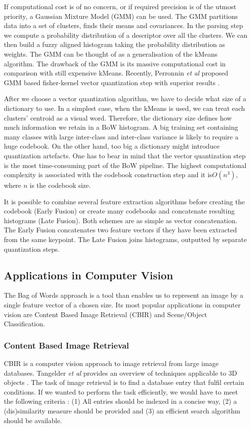 		If computational cost is of no concern, or if required precision is of the utmost priority, a Gaussian Mixture Model (GMM) can be used. The GMM partitions data into a set of clusters, finds their means and covariances. In the parsing step we compute a probability distribution of a descriptor over all the clusters. We can then build a fuzzy aligned histogram taking the probability distribution as weights. The GMM can be thought of as a generalisation of the kMeans algorithm. The drawback of the GMM is its massive computational cost in comparison with still expensive kMeans. Recently, Perronnin \textit{et al} proposed GMM based fisher-kernel vector quantization step with superior results \cite{fisher1, fisher2}.		
		
		After we choose a vector quantization algorithm, we have to decide what size of a dictionary to use. In a simplest case, when the kMeans is used, we can treat each clusters' centroid as a visual word. Therefore, the dictionary size defines how much information we retain in a BoW histogram. A big training set containing many classes with large inter-class and inter-class variance is likely to require a huge codebook. On the other hand, too big a dictionary might introduce quantization artefacts. One has to bear in mind that the vector quantization step is the most time-consuming part of the BoW pipeline. The highest computational complexity is associated with the codebook construction step and it is$O(n^3)$, where $n$ is the codebook size.		
		
		It is possible to combine several feature extraction algorithms before creating the codebook (Early Fusion) or create many codebooks and concatenate resulting histograms (Late Fusion). Both schemes are as simple as vector concatenation. The Early Fusion concatenates two feature vectors if they have been extracted from the same keypoint. The Late Fusion joins histograms, outputted by separate quantization steps.
	
	\subsection{Applications in Computer Vision}
	The Bag of Words approach is a tool than enables us to represent an image by a single feature vector of a chosen size. Its most popular applications in computer vision are Content Based Image Retrieval (CBIR) and Scene/Object Classification.
	
		\subsubsection{Content Based Image Retrieval}
		CBIR is a computer vision approach to image retrieval from large image databases. Tangelder \emph{et al} provides an overview of techniques applicable to 3D objects \cite{tangelder2008survey}. The task of image retrieval is to find a database entry that fulfil certain conditions. If we wanted to perform the task efficiently, we would have to meet the following criteria \cite{toldo2009bag}: (1) All entries should be indexed in a concise way, (2) a (dis)similarity measure should be provided and (3) an efficient search algorithm should be available. 
		
